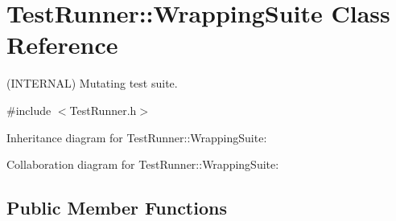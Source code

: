 \hypertarget{class_test_runner_1_1_wrapping_suite}{\section{Test\+Runner\+:\+:Wrapping\+Suite Class Reference}
\label{class_test_runner_1_1_wrapping_suite}
}


(I\+N\+T\+E\+R\+N\+A\+L) Mutating test suite.  




{\ttfamily \#include $<$Test\+Runner.\+h$>$}



Inheritance diagram for Test\+Runner\+:\+:Wrapping\+Suite\+:


Collaboration diagram for Test\+Runner\+:\+:Wrapping\+Suite\+:
\subsection*{Public Member Functions}
